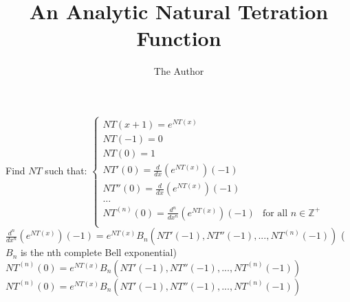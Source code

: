 \documentclass[11pt, oneside]{article}   	%
\title{An Analytic Natural Tetration Function}
\author{The Author}
\begin{document}
\maketitle

Find $NT$ such that:
$\begin{cases}
NT(x+1) = e^{NT(x)}\\
NT(-1) = 0\\
NT(0) = 1\\
NT'(0) = \frac{d}{dx}({e^{NT(x)}})(-1)\\
NT''(0) = \frac{d}{dx}({e^{NT(x)}})(-1)\\
\dots\\
NT^{(n)}(0) = \frac{d^n}{dx^n}({e^{NT(x)}})(-1)& \text{for all $n \in \mathbb{Z}^+$}\\
\end{cases}$\\
$\frac{d^n}{dx^n}({e^{NT(x)}})(-1) = e^{NT(x)}B_n(NT'(-1),NT''(-1),...,NT^{(n)}(-1))$ ($B_n$ is the nth complete Bell exponential)\\
$NT^{(n)}(0) = e^{NT(x)}B_n(NT'(-1),NT''(-1),...,NT^{(n)}(-1))$
$NT^{(n)}(0) = e^{NT(x)}B_n(NT'(-1),NT''(-1),...,NT^{(n)}(-1))$
\end{document}

